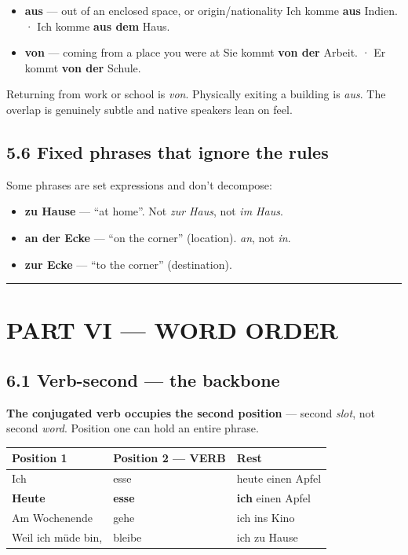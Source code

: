 \documentclass[
  11pt,
]{article}
\newcounter{none} %
\providecommand{\tightlist}{%
  \setlength{\itemsep}{0pt}\setlength{\parskip}{0pt}}
\begin{document}
\begin{itemize}
\tightlist
\item
  \textbf{aus} --- out of an enclosed space, or origin/nationality Ich
  komme \textbf{aus} Indien. · Ich komme \textbf{aus dem} Haus.
\item
  \textbf{von} --- coming from a place you were at Sie kommt \textbf{von
  der} Arbeit. · Er kommt \textbf{von der} Schule.
\end{itemize}

Returning from work or school is \emph{von}. Physically exiting a
building is \emph{aus}. The overlap is genuinely subtle and native
speakers lean on feel.

\subsection{5.6 Fixed phrases that ignore the
rules}\label{fixed-phrases-that-ignore-the-rules}

Some phrases are set expressions and don't decompose:

\begin{itemize}
\tightlist
\item
  \textbf{zu Hause} --- ``at home''. Not \emph{zur Haus}, not \emph{im
  Haus}.
\item
  \textbf{an der Ecke} --- ``on the corner'' (location). \emph{an}, not
  \emph{in}.
\item
  \textbf{zur Ecke} --- ``to the corner'' (destination).
\end{itemize}

\begin{center}\rule{0.5\linewidth}{0.5pt}\end{center}

\section{PART VI --- WORD ORDER}\label{part-vi-word-order}

\subsection{6.1 Verb-second --- the
backbone}\label{verb-second-the-backbone}

\textbf{The conjugated verb occupies the second position} --- second
\emph{slot}, not second \emph{word}. Position one can hold an entire
phrase.

{\def\LTcaptype{none} %
\begin{longtable}[]{@{}lll@{}}
\toprule\noalign{}
Position 1 & Position 2 --- VERB & Rest \\
\midrule\noalign{}
\endhead
\bottomrule\noalign{}
\endlastfoot
Ich & esse & heute einen Apfel \\
\textbf{Heute} & \textbf{esse} & \textbf{ich} einen Apfel \\
Am Wochenende & gehe & ich ins Kino \\
Weil ich müde bin, & bleibe & ich zu Hause \\
\end{longtable}
}
\end{document}
